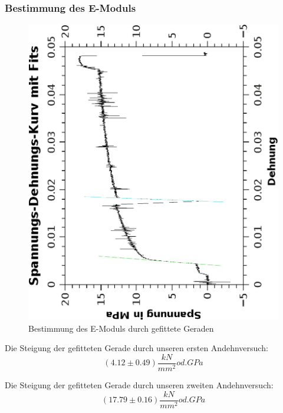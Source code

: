 \documentclass{article}
\begin{document}
\subsubsection*{Bestimmung des E-Moduls}
\begin{center}
\begin{figure}[H]
\caption{Bestimmung des E-Moduls durch gefittete Geraden}
\includegraphics[scale=0.8,angle=-90]{spannungmitfits.eps}
\end{figure}
\end{center}
Die Steigung der gefitteten Gerade durch unseren ersten Andehnversuch: 
$$ (4.12 \pm 0.49) \frac{kN}{mm^2} od. GPa $$

Die Steigung der gefitteten Gerade durch unseren zweiten Andehnversuch:
$$ (17.79 \pm 0.16) \frac{kN}{mm^2} od. GPa $$
\end{document}
